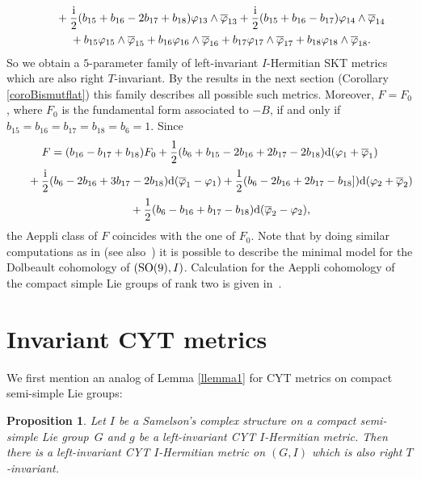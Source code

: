 \documentclass[pdftex]{sigma}
\numberwithin{equation}{section}
\newtheorem{Proposition}[Theorem]{Proposition}
 { \theoremstyle{definition}
\newtheorem{Definition}[Theorem]{Definition}
\newtheorem{Note}[Theorem]{Note}
\newtheorem{Example}[Theorem]{Example}
\newtheorem{Remark}[Theorem]{Remark} }
\begin{document}
\begin{Example}
\begin{gather*}
\hphantom{F = }{} + \frac{{\rm i}}{2} ( b_{15} + b_{16} -2 b_{17} +b_{18}) \varphi_{13} \wedge \overline \varphi_{13} + \frac{{\rm i}}{2} (b_{15} + b_{16} - b_{17}) \varphi_{14} \wedge \overline \varphi_{14}\\
\hphantom{F = }{} + b_{15} \varphi_{15} \wedge \overline \varphi_{15}+ b_{16} \varphi_{16} \wedge \overline \varphi_{16}+ b_{17} \varphi_{17} \wedge \overline \varphi_{17}+ b_{18} \varphi_{18} \wedge \overline \varphi_{18}.
\end{gather*}
So we obtain a $5$-parameter family of left-invariant $I$-Hermitian SKT metrics which are also right $T$-invariant. By the results in the next section (Corollary \ref{coroBismutflat}) this family describes all possible such metrics.
Moreover, $F = F_0$, where $F_0$ is the fundamental form associated to $- B$, if and only if $b_{15}= b_{16}= b_{17}= b_{18} = b_6 =1$. Since
\begin{gather*}
F = (b_{16} - b_{17} + b_{18}) F_0 + \frac{1}{2} (b_6 + b_{15} -2 b_{16} + 2 b_{17} -2 b_{18}) {\rm d} (\varphi_1 + \overline \varphi_1)\\[2pt]
\hphantom{F=}{} + \frac{{\rm i}}{2} (b_6 - 2b_{16} + 3 b_{17} - 2 b_{18}) {\rm d} (\overline \varphi_1 - \varphi_1)
+ \frac 12 (b_6 -2 b_{16} + 2 b_{17} - b_{18}]) {\rm d} ( \varphi_2 +\overline \varphi_2)\\[2pt]
\hphantom{F=}{} + \frac{1}{2} (b_6 - b_{16} + b_{17} - b_{18}) {\rm d} (\overline \varphi_2 - \varphi_2),
\end{gather*}
 the Aeppli class of $F$ coincides with the one of $F_0$. Note that by doing similar computations as in \cite{Pittie,Pittie2} (see also~\cite{LUV}) it is possible to describe the minimal model for the Dolbeault cohomology of $({\rm SO}(9), I)$. Calculation for the Aeppli cohomology of the compact simple Lie groups of rank two is given in~\cite{Barbaro}.
\end{Example}


\section{ Invariant CYT metrics}

We first mention an analog of Lemma \ref{llemma1} for CYT metrics on compact semi-simple Lie groups:

\begin{Proposition}
Let $I$ be a Samelson's complex structure on a compact semi-simple Lie group~$G$ and $g$ be a left-invariant CYT $I$-Hermitian metric. Then there is a left-invariant CYT $I$-Hermitian metric on $(G,I)$ which is also right $T$-invariant.
\end{Proposition}
\end{document}
